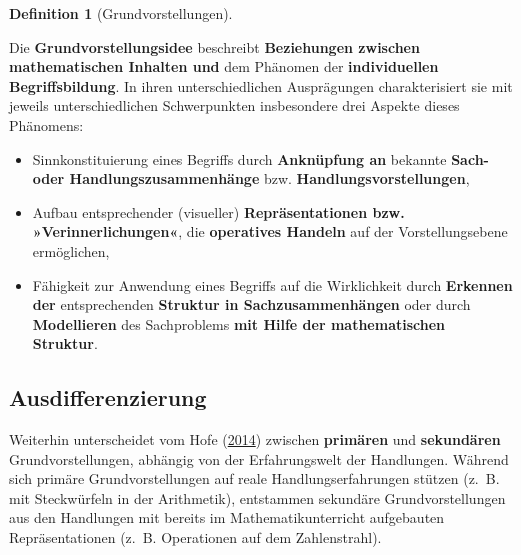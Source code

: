 \documentclass[
]{scrbook}
\providecommand{\tightlist}{%
  \setlength{\itemsep}{0pt}\setlength{\parskip}{0pt}}
\theoremstyle{definition}
\newtheorem{definition}{Definition}[chapter]
\theoremstyle{definition}
\theoremstyle{definition}
\theoremstyle{definition}
\theoremstyle{remark}
\begin{document}
\begin{definition}[Grundvorstellungen]
\protect\hypertarget{def:Grundvorstellungen}{}\label{def:Grundvorstellungen}

Die \textbf{Grundvorstellungsidee} beschreibt \textbf{Beziehungen zwischen mathematischen Inhalten und} dem Phänomen der \textbf{individuellen Begriffsbildung}. In ihren unterschiedlichen Ausprägungen charakterisiert sie mit jeweils unterschiedlichen Schwerpunkten insbesondere drei Aspekte dieses Phänomens:

\begin{itemize}
\tightlist
\item
  Sinnkonstituierung eines Begriffs durch \textbf{Anknüpfung an} bekannte \textbf{Sach- oder Handlungszusammenhänge} bzw. \textbf{Handlungsvorstellungen},
\item
  Aufbau entsprechender (visueller) \textbf{Repräsentationen bzw. »Verinnerlichungen«}, die \textbf{operatives Handeln} auf der Vorstellungsebene ermöglichen,
\item
  Fähigkeit zur Anwendung eines Begriffs auf die Wirklichkeit durch \textbf{Erkennen der} entsprechenden \textbf{Struktur in Sachzusammenhängen} oder durch \textbf{Modellieren} des Sachproblems \textbf{mit Hilfe der mathematischen Struktur}.
\end{itemize}

\end{definition}

\hypertarget{ausdifferenzierung}{%
\subsection{Ausdifferenzierung}\label{ausdifferenzierung}}

Weiterhin unterscheidet vom Hofe (\protect\hyperlink{ref-vomHofe2014}{2014}) zwischen \textbf{primären} und \textbf{sekundären} Grundvorstellungen, abhängig von der Erfahrungswelt der Handlungen. Während sich primäre Grundvorstellungen auf reale Handlungserfahrungen stützen (z.~B. mit Steckwürfeln in der Arithmetik), entstammen sekundäre Grundvorstellungen aus den Handlungen mit bereits im Mathematikunterricht aufgebauten Repräsentationen (z.~B. Operationen auf dem Zahlenstrahl).
\end{document}
